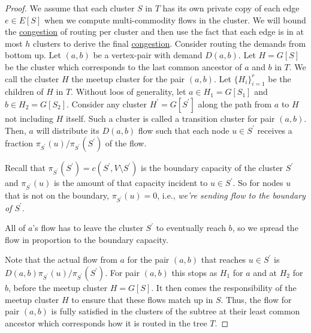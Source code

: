 \begin{proof}
	We assume that each cluster \(S\) in \(T\) has its own private copy of each edge \(e \in E[S]\) when we compute multi-commodity flows in the cluster. We will bound the \hyperref[def:congestion]{congestion} of routing per cluster and then use the fact that each edge is in at most \(h\) clusters to derive the final \hyperref[def:congestion]{congestion}. Consider routing the demands from bottom up. Let \((a, b)\) be a vertex-pair with demand \(D(a, b)\). Let \(H = G[S]\) be the cluster which corresponds to the last common ancestor of \(a\) and \(b\) in \(T\). We call the cluster \(H\) the meetup cluster for the pair \((a, b)\). Let \(\{ H_i \} _{i=1}^{r}\) be the children of \(H\) in \(T\). Without loos of generality, let \(a \in H_1 = G[S_1]\) and \(b \in H_2 = G[S_2]\). Consider any cluster \(H^{\prime} = G[S^{\prime} ]\) along the path from \(a\) to \(H\) not including \(H\) itself. Such a cluster is called a transition cluster for pair \((a, b)\). Then, \(a\) will distribute its \(D(a, b)\) flow such that each node \(u \in S^{\prime} \) receives a fraction \(\pi _{S^{\prime} }(u) / \pi _{S^{\prime} }(S^{\prime} )\) of the flow.

	\begin{remark}
		Recall that \(\pi _{S^{\prime} }(S^{\prime} ) = c(S^{\prime} , V\setminus S^{\prime} )\) is the boundary capacity of the cluster \(S^{\prime} \) and \(\pi _{S^{\prime} }(u)\) is the amount of that capacity incident to \(u \in S^{\prime} \). So for nodes \(u\) that is not on the boundary, \(\pi _{S^{\prime} }(u) = 0\), i.e., \emph{we're sending flow to the boundary of \(S^{\prime} \)}.
	\end{remark}

	\begin{intuition}
		All of \(a\)'s flow has to leave the cluster \(S^{\prime} \) to eventually reach \(b\), so we spread the flow in proportion to the boundary capacity.
	\end{intuition}

	Note that the actual flow from \(a\) for the pair \((a, b)\) that reaches \(u \in S^{\prime} \) is \(D(a, b) \pi _{S^{\prime} }(u) / \pi _{S^{\prime} }(S^{\prime} )\). For pair \((a, b)\) this stops as \(H_1\) for \(a\) and at \(H_2\) for \(b\), before the meetup cluster \(H = G[S]\). It then comes the responsibility of the meetup cluster \(H\) to ensure that these flows match up in \(S\). Thus, the flow for pair \((a, b)\) is fully satisfied in the clusters of the subtree at their least common ancestor which corresponds how it is routed in the tree \(T\).


\end{proof}
